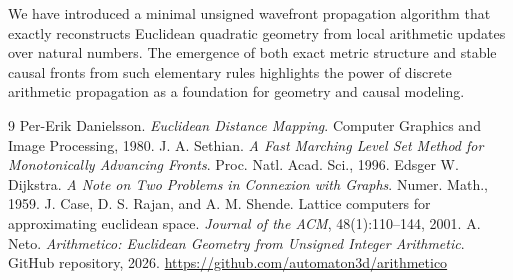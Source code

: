 \documentclass[11pt,a4paper]{article}
\begin{document}
We have introduced a minimal unsigned wavefront propagation algorithm that exactly reconstructs Euclidean quadratic geometry from local arithmetic updates over natural numbers. The emergence of both exact metric structure and stable causal fronts from such elementary rules highlights the power of discrete arithmetic propagation as a foundation for geometry and causal modeling.

\begin{thebibliography}{9}
 Per-Erik Danielsson. \textit{Euclidean Distance Mapping}. Computer Graphics and Image Processing, 1980.
 J. A. Sethian. \textit{A Fast Marching Level Set Method for Monotonically Advancing Fronts}. Proc. Natl. Acad. Sci., 1996.
 Edsger W. Dijkstra. \textit{A Note on Two Problems in Connexion with Graphs}. Numer. Math., 1959.
 J. Case, D. S. Rajan, and A. M. Shende. Lattice computers for approximating euclidean space. \textit{Journal of the ACM}, 48(1):110--144, 2001.
 A. Neto. \textit{Arithmetico: Euclidean Geometry from Unsigned Integer Arithmetic}. GitHub repository, 2026. \url{https://github.com/automaton3d/arithmetico}
\end{thebibliography}
\end{document}
